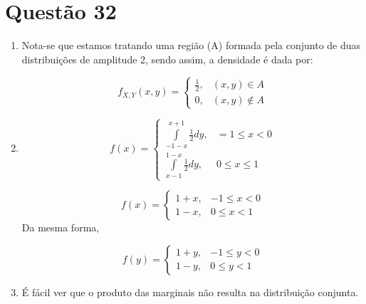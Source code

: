 \documentclass[a4paper,12pt]{report}
\begin{document}
	\section{Questão 32}
		\begin{enumerate}[label=\alph*)]
				\item 
						
Nota-se que estamos tratando uma região (A) formada pela conjunto de duas distribuições  de amplitude 2, sendo assim, a densidade é dada por:
																		
				$$	f_{X,Y}(x,y) = \begin{cases}
					\frac{1}{2}, &  (x,y)\in A\\
				0, & (x,y)\not\in A
	\end{cases}
				$$
				\item 
					$$f(x) =\begin{cases}
				\int\limits_{-1-x}^{x+1} \frac{1}{2} dy, & =1\le x < 0\\
					\int\limits_{x-1}^{1-x} \frac{1}{2} dy, & 0\le x \le 1
			\end{cases}$$
																		
			$$
				f(x) = \begin{cases}
			1+x, &-1\le x < 0\\
			1-x, & 0\le x < 1
			\end{cases}
			$$
																		Da mesma forma,
																		
																	$$
																	f(y) = \begin{cases}
																	1+y, &-1\le y < 0\\
																	1-y, & 0\le y < 1
																	
																	\end{cases}
																	$$	
																	\item É fácil ver que o produto das marginais não resulta na distribuição conjunta.
		\end{enumerate}
																						
\end{document}

